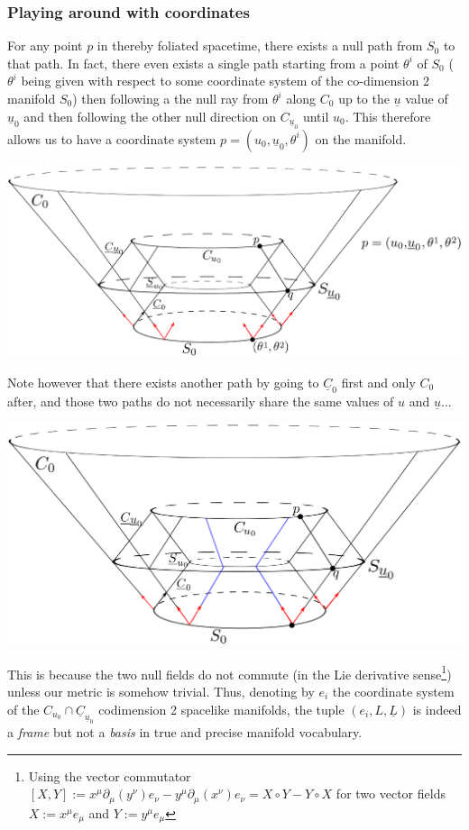 \documentclass[a4paper,11pt]{article}
\numberwithin{equation}{section}
\theoremstyle{definition}
\begin{document}
\subsubsection{Playing around with coordinates}\label{TorsionWarning}
For any point $p$ in thereby foliated spacetime, there exists a null path from $S_0$ to that path. In fact, there even exists a single path starting from a point $\theta^i$ of $S_0$ ($\theta^i$ being given with respect to some coordinate system of the co-dimension 2 manifold $S_0$) then following a the null ray from $\theta^i$ along $C_0$ up to the $\underline{u}$ value of $\underline{u}_0$ and then following the other null direction on $C_{\underline{u}_0}$ until $u_0$. This therefore allows us to have a coordinate system $p=(u_0, \underline{u}_0, \theta^i)$ on the manifold.
\begin{center}
    \includegraphics [width=0.75\linewidth] {Pictures/04_Coordinates.png}
\end{center}

Note however that there exists another path by going to $\underline{C}_0$ first and only $C_0$ after, and those two paths do not necessarily share the same values of $u$ and $\underline{u}$... 
\begin{center}
    \includegraphics [width=0.75\linewidth] {Pictures/05_Torsion.png}
\end{center}

This is because the two null fields do not commute (in the Lie derivative sense\footnote{Using the vector commutator $[X,Y]:=x^\mu \partial_\mu (y^\nu) e_\nu - y^\mu \partial_\mu (x^\nu) e_\nu = X\circ Y - Y \circ X$ for two vector fields $X:=x^\mu e_\mu$ and $Y:=y^\mu e_\mu$}) unless our metric is somehow trivial. Thus, denoting by $e_i$ the coordinate system of the $C_{u_0}\cap\underline{C}_{\underline{u}_0}$ codimension 2 spacelike manifolds, the tuple $(e_i, L, \underline{L})$ is indeed a \emph{frame} but not a \emph{basis} in true and precise manifold vocabulary.
\end{document}
